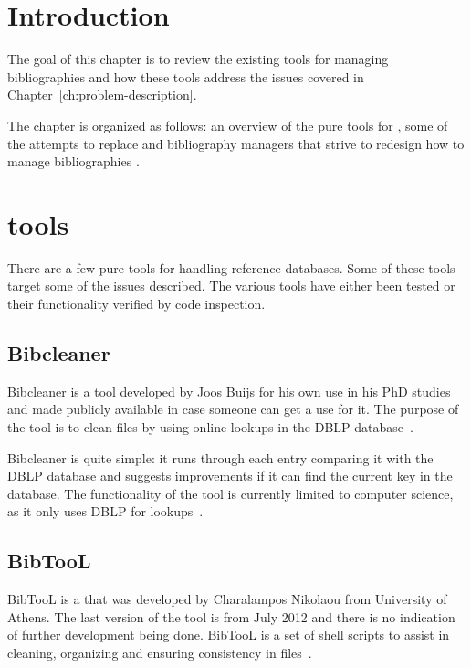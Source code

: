 \section{Introduction}
The goal of this chapter is to review the existing tools for managing
bibliographies and how these tools address the issues covered in
Chapter~\ref{ch:problem-description}.

The chapter is organized as follows: an overview of the pure tools for
{\bibtex} , some of the attempts to replace
{\bibtex}  and bibliography managers
that strive to redesign how to manage bibliographies
.


\section{{\bibtex} tools}
\label{sec:bibtex_tools}
There are a few pure {\bibtex} tools for handling reference databases.
Some of these tools target some of the issues described.  The various
tools have either been tested or their functionality verified by code
inspection.

\subsection{Bibcleaner}
Bibcleaner is a tool developed by Joos Buijs for his own use in his
PhD studies and made publicly available in case someone can get a use
for it.  The purpose of the tool is to clean {\bibtex} files by using
online lookups in the DBLP database~\cite{bibcleaner_source,
  bibcleaner_question}.

Bibcleaner is quite simple: it runs through each entry comparing it
with the DBLP database and suggests improvements if it can find the
current key in the database.  The functionality of the tool is
currently limited to computer science, as it only uses DBLP for
lookups~\cite{bibcleaner_source}.

\subsection{BibTooL}
BibTooL is a {\bibtex} that was developed by Charalampos Nikolaou from
University of Athens.  The last version of the tool is from July 2012
and there is no indication of further development being done.  BibTooL
is a set of shell scripts to assist in cleaning, organizing and
ensuring consistency in {\bibtex} files~\cite{bibtool_site}.

